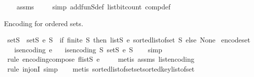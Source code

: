 \begin{isabellebody}
%
\isadelimproof
\ \ %
\endisadelimproof
%
\isatagproof
{}\isamarkupfalse%
\ assms\ \isanewline
\ \ \isamarkupfalse%
\ {\isacharparenleft}{\kern0pt}simp\ add{\isacharcolon}{\kern0pt}fun\isactrlsub S{\isacharunderscore}{\kern0pt}def\ list{\isacharunderscore}{\kern0pt}bit{\isacharunderscore}{\kern0pt}count\ comp{\isacharunderscore}{\kern0pt}def{\isacharparenright}{\kern0pt}%
\endisatagproof
{\isafoldproof}%
%
\isadelimproof
%
\endisadelimproof
%
\begin{isamarkuptext}%
Encoding for ordered sets.%
\end{isamarkuptext}\isamarkuptrue%
\isamarkupfalse%
\ set\isactrlsub S\ \ {\isachardoublequoteopen}set\isactrlsub S\ e\ S\ {\isacharequal}{\kern0pt}\ {\isacharparenleft}{\kern0pt}if\ finite\ S\ then\ list\isactrlsub S\ e\ {\isacharparenleft}{\kern0pt}sorted{\isacharunderscore}{\kern0pt}list{\isacharunderscore}{\kern0pt}of{\isacharunderscore}{\kern0pt}set\ S{\isacharparenright}{\kern0pt}\ else\ None{\isacharparenright}{\kern0pt}{\isachardoublequoteclose}\isanewline
\isanewline
{}\isamarkupfalse%
\ encode{\isacharunderscore}{\kern0pt}set{\isacharcolon}{\kern0pt}\isanewline
\ \ \ {\isachardoublequoteopen}is{\isacharunderscore}{\kern0pt}encoding\ e{\isachardoublequoteclose}\isanewline
\ \ \ {\isachardoublequoteopen}is{\isacharunderscore}{\kern0pt}encoding\ {\isacharparenleft}{\kern0pt}{\isasymlambda}S{\isachardot}{\kern0pt}\ set\isactrlsub S\ e\ S{\isacharparenright}{\kern0pt}{\isachardoublequoteclose}\isanewline
%
\isadelimproof
\ \ %
\endisadelimproof
%
\isatagproof
{}\isamarkupfalse%
\ simp\isanewline
\ \ \isamarkupfalse%
\ {\isacharparenleft}{\kern0pt}rule\ encoding{\isacharunderscore}{\kern0pt}compose{\isacharbrackleft}{\kern0pt}\ f{\isacharequal}{\kern0pt}{\isachardoublequoteopen}list\isactrlsub S\ e{\isachardoublequoteclose}{\isacharbrackright}{\kern0pt}{\isacharparenright}{\kern0pt}\isanewline
\ \ \ \isamarkupfalse%
\ {\isacharparenleft}{\kern0pt}metis\ assms\ list{\isacharunderscore}{\kern0pt}encoding{\isacharparenright}{\kern0pt}\isanewline
\ \ \isamarkupfalse%
\ {\isacharparenleft}{\kern0pt}rule\ inj{\isacharunderscore}{\kern0pt}onI{\isacharcomma}{\kern0pt}\ simp{\isacharparenright}{\kern0pt}\isanewline
\ \ \isamarkupfalse%
\ {\isacharparenleft}{\kern0pt}metis\ sorted{\isacharunderscore}{\kern0pt}list{\isacharunderscore}{\kern0pt}of{\isacharunderscore}{\kern0pt}set{\isachardot}{\kern0pt}set{\isacharunderscore}{\kern0pt}sorted{\isacharunderscore}{\kern0pt}key{\isacharunderscore}{\kern0pt}list{\isacharunderscore}{\kern0pt}of{\isacharunderscore}{\kern0pt}set{\isacharparenright}{\kern0pt}%

\end{isabellebody}

